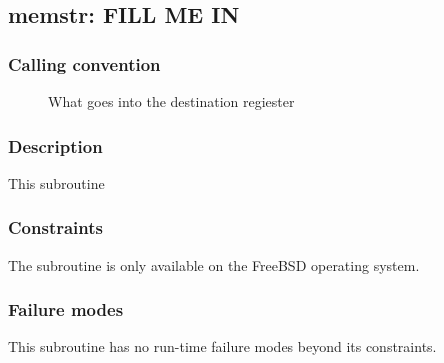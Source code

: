 \clearpage
{}
{}
\label{subr:memstr}
\subsection*{memstr: FILL ME IN}

\subsubsection*{Calling convention}

\begin{description}
\item[] What goes into the destination regiester
\end{description}

\subsubsection*{Description}

This subroutine 

\subsubsection*{Constraints}

The  subroutine is only available on the FreeBSD operating
system.

\subsubsection*{Failure modes}

This subroutine has no run-time failure modes beyond its constraints.
